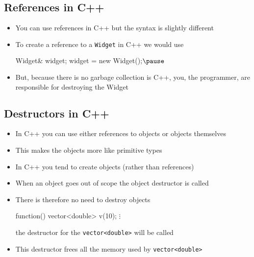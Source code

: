 
\begin{slide}
\section{References in C++}

\begin{PauseHighLight}
  \begin{itemize}
  \item You can use references in C++ but the syntax is slightly
    different\pause
  \item To create a reference to a \texttt{Widget} in C++ we would use
    \begin{java}
      Widget& widget;
      widget = new Widget();$\pause$
    \end{java}
  \item But, because there is no garbage collection is C++, you, the
    programmer, are responsible for destroying the Widget\pause
  \end{itemize}
\end{PauseHighLight}

\end{slide}



\begin{slide}
\section[-2]{Destructors in C++}

\begin{PauseHighLight}
  \begin{itemize}\squeeze
  \item In C++ you can use either references to objects or objects
    themselves\pause
  \item This makes the objects more like primitive types\pause
  \item In C++ you tend to create objects (rather than references)\pause
  \item When an object goes out of scope the object destructor is
    called\pause
  \item There is therefore no need to destroy objects
    \begin{java}
      function() {
        vector<double> v(10);
        $\vdots$
      }
    \end{java}
    the destructor for the \texttt{vector<double>} will be called\pause
  \item This destructor frees all the memory used by
  \texttt{vector<double>}\pause
  \end{itemize}
\end{PauseHighLight}

\end{slide}

